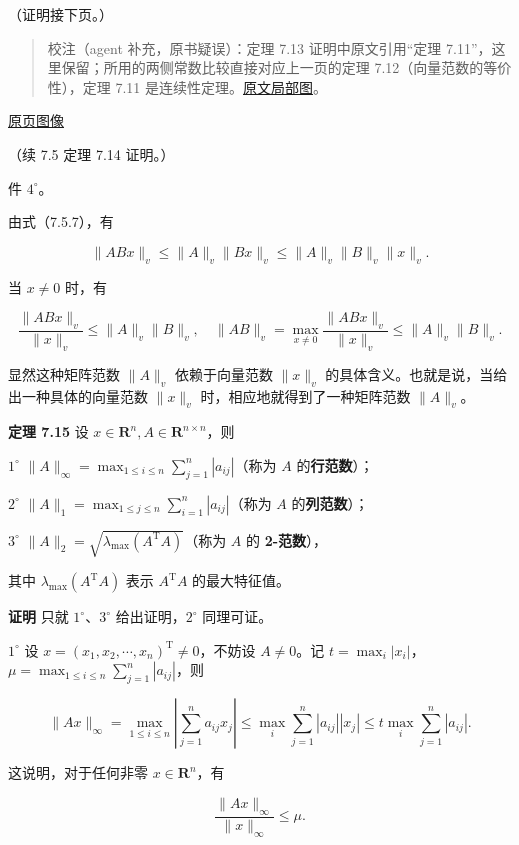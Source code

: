 \documentclass[
  10pt,
  fontset=fandol]{ctexart}
\begin{document}
（证明接下页。）

\begin{quote}
校注（agent 补充，原书疑误）：定理 7.13 证明中原文引用``定理 7.11''，这里保留；所用的两侧常数比较直接对应上一页的定理 7.12（向量范数的等价性），定理 7.11 是连续性定理。\href{../assets/ch07b/202-reference.png}{原文局部图}。
\end{quote}

\href{../../source-images/pdf-203.jpeg}{原页图像}

（续 7.5 定理 7.14 证明。）

件 \(4^\circ\)。

由式（7.5.7），有

\[
\|ABx\|_v\leqslant\|A\|_v\|Bx\|_v\leqslant\|A\|_v\|B\|_v\|x\|_v.
\]

当 \(x\neq0\) 时，有

\[
\frac{\|ABx\|_v}{\|x\|_v}\leqslant\|A\|_v\|B\|_v,\quad
\|AB\|_v=\max_{x\neq0}\frac{\|ABx\|_v}{\|x\|_v}\leqslant\|A\|_v\|B\|_v.
\]

显然这种矩阵范数 \(\|A\|_v\) 依赖于向量范数 \(\|x\|_v\) 的具体含义。也就是说，当给出一种具体的向量范数 \(\|x\|_v\) 时，相应地就得到了一种矩阵范数 \(\|A\|_v\)。

\textbf{定理 7.15} 设 \(x\in\mathbf R^n,A\in\mathbf R^{n\times n}\)，则

\(1^\circ\) \(\|A\|_\infty=\max_{1\leqslant i\leqslant n}\sum_{j=1}^{n}|a_{ij}|\)（称为 \(A\) 的\textbf{行范数}）；

\(2^\circ\) \(\|A\|_1=\max_{1\leqslant j\leqslant n}\sum_{i=1}^{n}|a_{ij}|\)（称为 \(A\) 的\textbf{列范数}）；

\(3^\circ\) \(\|A\|_2=\sqrt{\lambda_{\max}(A^{\mathrm T}A)}\)（称为 \(A\) 的 \textbf{2-范数}），

其中 \(\lambda_{\max}(A^{\mathrm T}A)\) 表示 \(A^{\mathrm T}A\) 的最大特征值。

\textbf{证明} 只就 \(1^\circ\)、\(3^\circ\) 给出证明，\(2^\circ\) 同理可证。

\(1^\circ\) 设 \(x=(x_1,x_2,\cdots,x_n)^{\mathrm T}\neq0\)，不妨设 \(A\neq0\)。记 \(t=\max_i|x_i|\)，\(\mu=\max_{1\leqslant i\leqslant n}\sum_{j=1}^{n}|a_{ij}|\)，则

\[
\|Ax\|_\infty
=\max_{1\leqslant i\leqslant n}\left|\sum_{j=1}^{n}a_{ij}x_j\right|
\leqslant\max_i\sum_{j=1}^{n}|a_{ij}||x_j|
\leqslant t\max_i\sum_{j=1}^{n}|a_{ij}|.
\]

这说明，对于任何非零 \(x\in\mathbf R^n\)，有

\[
\frac{\|Ax\|_\infty}{\|x\|_\infty}\leqslant\mu.
\tag{7.5.8}
\]
\end{document}

